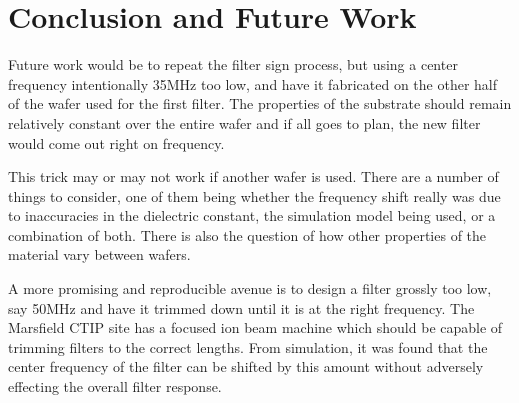 \section{Conclusion and Future Work}

Future work would be to repeat the filter sign process, but using a center frequency intentionally 35MHz too low, and have it fabricated on the other half of the wafer used for the first filter. The properties of the substrate should remain relatively constant over the entire wafer and if all goes to plan, the new filter would come out right on frequency.

This trick may or may not work if another wafer is used. There are a number of things to consider, one of them being whether the frequency shift really was due to inaccuracies in the dielectric constant, the simulation model being used, or a combination of both. There is also the question of how other properties of the material vary between wafers.

A more promising and reproducible avenue is to design a filter grossly too low, say 50MHz and have it trimmed down until it is at the right frequency. The Marsfield CTIP site has a focused ion beam machine which should be capable of trimming filters to the correct lengths. From simulation, it was found that the center frequency of the filter can be shifted by this amount without adversely effecting the overall filter response. 


